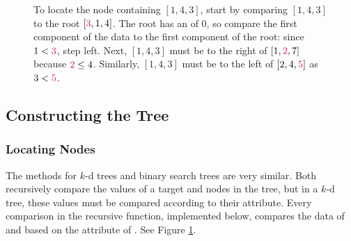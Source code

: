 \begin{figure}[H]
    \caption{To locate the node containing $[1,4,3]$, start by comparing $[1,4,3]$ to the root $[\textcolor{red}{3},1,4]$.
    The root has an  of $0$, so compare the first component of the data to the first component of the root: since $1<\textcolor{red}{3}$, step left.
    Next, $[1,4,3]$ must be to the right of $[1,\textcolor{red}{2},7]$ because $\textcolor{red}{2}\le 4$.
    Similarly, $[1,4,3]$ must be to the left of $[2,4,\textcolor{red}{5}]$ as $3<\textcolor{red}{5}$.} %
    \label{fig:nearest-neighbor-kdfind}
    \end{figure}

\subsection*{Constructing the Tree} %

\subsubsection*{Locating Nodes} %

The  methods for $k$-d trees and binary search trees are very similar.
Both recursively compare the values of a target and nodes in the tree, but in a $k$-d tree, these values must be compared according to their  attribute.
Every comparison in the recursive  function, implemented below, compares the data of  and  based on the  attribute of .
See Figure \ref{fig:nearest-neighbor-kdfind}.

